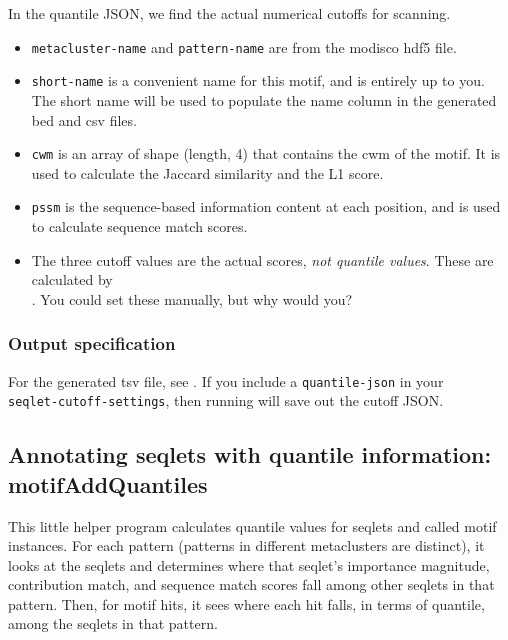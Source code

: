 \documentclass{article}
\begin{document}
In the quantile JSON, we find the actual numerical cutoffs for scanning.

\begin{itemize}
    \item \texttt{metacluster-name} and \texttt{pattern-name} are from the
        modisco hdf5 file.
    \item \texttt{short-name} is a convenient name for this motif, and is
        entirely up to you.
        The short name will be used to populate the name column in the generated
        bed and csv files.
    \item \texttt{cwm} is an array of shape (length, 4) that contains the cwm of
        the motif.
        It is used to calculate the Jaccard similarity and the L1 score.
    \item \texttt{pssm} is the sequence-based information content at each
        position, and is used to calculate sequence match scores.
    \item The three cutoff values are the actual scores,
        \emph{not quantile values}.
        These are calculated by \\ .
        You could set these manually, but why would you?
\end{itemize}

\subsubsection{Output specification}
For the generated tsv file, see .
If you include a \texttt{quantile-json} in
your \\ \texttt{seqlet-cutoff-settings}, then running  will
save out the cutoff JSON.


\newpage


\subsection{Annotating seqlets with quantile information: {motifAddQuantiles}}\label{prog:motifAddQuantiles}

This little helper program calculates quantile values for seqlets and called
motif instances.
For each pattern (patterns in different metaclusters are distinct), it looks at
the seqlets and determines where that seqlet's importance magnitude,
contribution match, and sequence match scores fall among other seqlets in that
pattern.
Then, for motif hits, it sees where each hit falls, in terms of quantile, among
the seqlets in that pattern.
\end{document}
